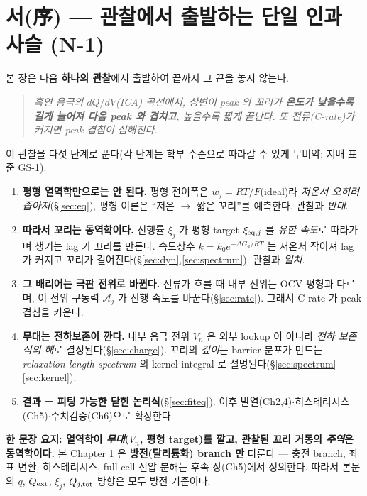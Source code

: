 
\section*{서(序) — 관찰에서 출발하는 단일 인과 사슬 (N-1)}
본 장은 다음 \textbf{하나의 관찰}에서 출발하여 끝까지 그 끈을 놓지 않는다.
\begin{quote}\itshape
흑연 음극의 $dQ/dV$(ICA) 곡선에서, 상변이 peak 의 꼬리가 \textbf{온도가 낮을수록 길게 늘어져 다음
peak 와 겹치고}, 높을수록 짧게 끝난다. 또 전류(C-rate)가 커지면 peak 겹침이 심해진다.
\end{quote}
이 관찰을 다섯 단계로 푼다(각 단계는 학부 수준으로 따라갈 수 있게 무비약; 지배 표준 GS-1).
\begin{enumerate}[label=(\arabic*),leftmargin=2.0em]
\item \textbf{평형 열역학만으로는 안 된다.} 평형 전이폭은 $w_j=RT/F$(ideal)라 \emph{저온서 오히려
  좁아져}(\S\ref{sec:eq}), 평형 이론은 ``저온 $\to$ 짧은 꼬리''를 예측한다. 관찰과 \emph{반대}.
\item \textbf{따라서 꼬리는 동역학이다.} 진행률 $\xi_j$ 가 평형 target $\xi_{\mathrm{eq},j}$ 를 \emph{유한
  속도}로 따라가며 생기는 lag 가 꼬리를 만든다. 속도상수 $k=k_0e^{-\Delta G_a/RT}$ 는 저온서 작아져
  lag 가 커지고 꼬리가 길어진다(\S\ref{sec:dyn},\ref{sec:spectrum}). 관찰과 \emph{일치}.
\item \textbf{그 배리어는 극판 전위로 바뀐다.} 전류가 흐를 때 내부 전위는 OCV 평형과 다르며, 이
  전위 구동력 $\mathcal A_j$ 가 진행 속도를 바꾼다(\S\ref{sec:rate}). 그래서 C-rate 가 peak 겹침을 키운다.
\item \textbf{무대는 전하보존이 깐다.} 내부 음극 전위 $V_n$ 은 외부 lookup 이 아니라 \emph{전하 보존식의
  해}로 결정된다(\S\ref{sec:charge}). 꼬리의 \emph{깊이}는 barrier 분포가 만드는 \emph{relaxation-length
  spectrum} 의 kernel integral 로 설명된다(\S\ref{sec:spectrum}--\ref{sec:kernel}).
\item \textbf{결과 = 피팅 가능한 닫힌 논리식}(\S\ref{sec:fiteq}). 이후 발열(Ch2,4)$\cdot$히스테리시스
  (Ch5)$\cdot$수치검증(Ch6)으로 확장한다.
\end{enumerate}
\noindent\textbf{한 문장 요지: 열역학이 \emph{무대}($V_n$, 평형 target)를 깔고, 관찰된 꼬리 거동의
\emph{주역}은 동역학이다.} 본 Chapter 1 은 \textbf{방전(탈리튬화) branch 만} 다룬다 — 충전 branch,
좌표 변환, 히스테리시스, full-cell 전압 분해는 후속 장(Ch5)에서 정의한다. 따라서 본문의 $q$,
$Q_{\mathrm{ext}}$, $\xi_j$, $Q_{j,\mathrm{tot}}$ 방향은 모두 방전 기준이다.

